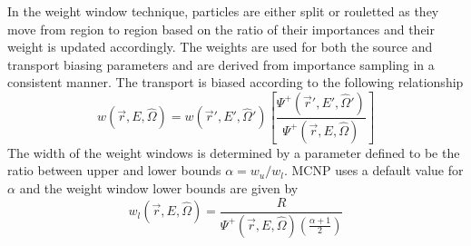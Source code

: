 In the weight window technique, particles are either split or
rouletted as they move from region to region based on the ratio of their
importances and their weight is updated accordingly.  
The weights are used for both the source and transport biasing parameters and
are derived from importance sampling in a consistent manner.  
The transport is biased according to the following relationship
\begin{equation} \label{eq:11}
	w(\overrightarrow{r}, E, \widehat{\Omega})=
	w(\overrightarrow{r}', E', \widehat{\Omega}')
	\left [ \frac{\Psi^{+}(\overrightarrow{r}', E', \widehat{\Omega}')}
	{\Psi^{+}(\overrightarrow{r}, E, \widehat{\Omega})} \right ]
\end{equation}
The width of the weight windows is determined by a parameter defined to be the
ratio between upper and lower bounds $\alpha =
w_{u}/w_{l}$.  MCNP uses a default value for $\alpha$ and the weight window lower
bounds are given by 
\begin{equation} \label{eq:12}
	w_{l}(\overrightarrow{r}, E, \widehat{\Omega}) = 
	\frac{R}{\Psi^{+}(\overrightarrow{r}, E, \widehat{\Omega})
	(\frac{\alpha + 1}{2})}
\end{equation}




